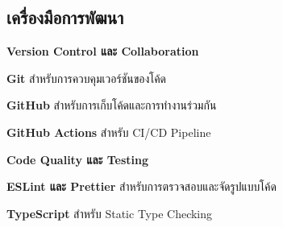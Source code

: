 \subsection{เครื่องมือการพัฒนา}

\hspace*{1.5em} %
\textbf{Version Control และ Collaboration}
\begin{mycustomitem}
    \item \textbf{Git} สำหรับการควบคุมเวอร์ชันของโค้ด
    \item \textbf{GitHub} สำหรับการเก็บโค้ดและการทำงานร่วมกัน
    \item \textbf{GitHub Actions} สำหรับ CI/CD Pipeline
\end{mycustomitem}

\hspace*{1.5em} %
\textbf{Code Quality และ Testing}
\begin{mycustomitem}
    \item \textbf{ESLint และ Prettier} สำหรับการตรวจสอบและจัดรูปแบบโค้ด
    \item \textbf{TypeScript} สำหรับ Static Type Checking
\end{mycustomitem}
